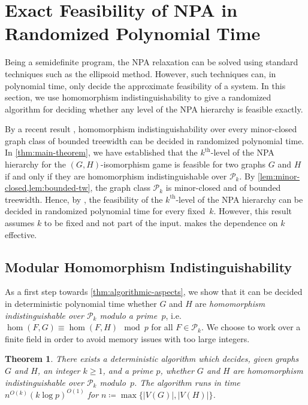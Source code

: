 \documentclass[11pt,a4paper]{article}
\theoremstyle{plain}
\newtheorem{thm}{Theorem}[section]
\theoremstyle{remark}
\theoremstyle{definition}
\begin{document}
\section{Exact Feasibility of NPA in Randomized Polynomial Time}
\label{sec:alg-aspects}
Being a semidefinite program, the NPA relaxation can be solved using standard techniques such as the ellipsoid method. 
However, such techniques can, in polynomial time, only decide the approximate feasibility of a system.
In this section, we use homomorphism indistinguishability to give a randomized algorithm for deciding whether any level of the NPA hierarchy is feasible exactly.
\thmAlgorithm*

By a recent result \cite[Theorem~1.1]{seppelt_algorithmic_2024},
homomorphism indistinguishability over every minor-closed graph class of bounded treewidth can be decided in randomized polynomial time.
In \cref{thm:main-theorem}, we have established that the $k^{\text{th}}$-level of the NPA hierarchy for the $(G,H)$-isomorphism game is feasible for two graphs $G$ and $H$ if and only if 
they are homomorphism indistinguishable over $\mathcal{P}_k$.
By \cref{lem:minor-closed,lem:bounded-tw},
the graph class $\mathcal{P}_k$ is minor-closed and of bounded treewidth. 
Hence, by \cite[Theorem~1.1]{seppelt_algorithmic_2024}, 
the feasibility of the $k^{\text{th}}$-level of the NPA hierarchy can be decided in randomized polynomial time for every fixed~$k$.
However, this result assumes $k$ to be fixed and not part of the input.
 makes the dependence on $k$ effective.

\subsection{Modular Homomorphism Indistinguishability}
\label{sec:mod-hom}
As a first step towards \cref{thm:algorithmic-aspects}, we show that it can be decided in deterministic polynomial time whether $G$ and $H$ are \emph{homomorphism indistinguishable over $\mathcal{P}_k$ modulo a prime~$p$}, i.e.\ $\hom(F, G) \equiv \hom(F, H) \mod p$ for all $F \in \mathcal{P}_k$. 
We choose to work over a finite field in order to avoid memory issues with too large integers.


\begin{thm}\label{thm:algorithmic-aspects-prime}
    There exists a deterministic algorithm which decides, given graphs $G$ and $H$, an integer $k\geq 1$, and a prime $p$,
    whether $G$ and $H$ are homomorphism indistinguishable over $\mathcal{P}_k$ modulo~$p$.
    The algorithm runs in time $n^{O(k)} (k \log p)^{O(1)}$ for $n \coloneqq \max \{\lvert V(G) \rvert , \lvert V(H) \rvert  \}$.
\end{thm}
\end{document}
